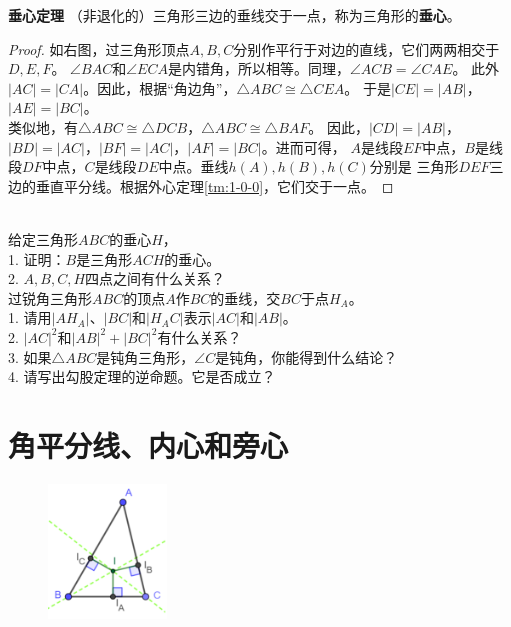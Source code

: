 \documentclass[12pt,UTF8]{ctexbook}
\begin{document}
\begin{tm}{\textbf{垂心定理}}\label{tm:1-1-0}
    （非退化的）三角形三边的垂线交于一点，称为三角形的\textbf{垂心}。
\end{tm}

\begin{proof}
    如右图，过三角形顶点$A,B,C$分别作平行于对边的直线，它们两两相交于$D,E,F$。
    $\angle BAC$和$\angle ECA$是内错角，所以相等。同理，$\angle ACB = \angle CAE$。
    此外$|AC| = |CA|$。因此，根据“角边角”，$\triangle ABC \cong \triangle CEA$。
    于是$|CE| = |AB|$，$|AE| = |BC|$。\\
    类似地，有$\triangle ABC \cong \triangle DCB$，$\triangle ABC \cong \triangle BAF$。
    因此，$|CD| = |AB|$，$|BD| = |AC|$，$|BF| = |AC|$，$|AF| = |BC|$。进而可得，
    $A$是线段$EF$中点，$B$是线段$DF$中点，$C$是线段$DE$中点。垂线$h(A), h(B), h(C)$分别是
    三角形$DEF$三边的垂直平分线。根据外心定理\ref{tm:1-0-0}，它们交于一点。
\end{proof}
\begin{xt}\label{xt:1-1-0}
    \mbox{}\\
    给定三角形$ABC$的垂心$H$，\\
    1. 证明：$B$是三角形$ACH$的垂心。\\
    2. $A,B,C,H$四点之间有什么关系？\\
    过锐角三角形$ABC$的顶点$A$作$BC$的垂线，交$BC$于点$H_A$。\\
    1. 请用$|AH_A|$、$|BC|$和$|H_AC|$表示$|AC|$和$|AB|$。\\
    2. $|AC|^2$和$|AB|^2 + |BC|^2$有什么关系？\\
    3. 如果$\triangle ABC$是钝角三角形，$\angle C$是钝角，你能得到什么结论？\\
    4. 请写出勾股定理的逆命题。它是否成立？
\end{xt}

\section{角平分线、内心和旁心}

\begin{figure} %
    \vspace{-40pt}
    \flushright
    \includegraphics[width=0.28\textwidth]{tu/三角形内心.png}
\end{figure}
\end{document}
